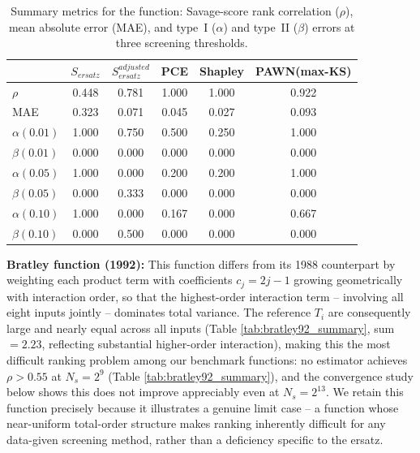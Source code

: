 \documentclass[12pt]{article}
\begin{document}
\begin{table}[H]
\centering
\begin{tabular}{@{}l|ccccc@{}} \toprule
 & $S_{ersatz}$ & $S^{adjusted}_{ersatz}$ & PCE & Shapley & PAWN(max-KS) \\ \midrule
$\rho$           & 0.448 & 0.781 & 1.000 & 1.000 & 0.922 \\
MAE              & 0.323 & 0.071 & 0.045 & 0.027 & 0.093 \\
$\alpha(0.01)$   & 1.000 & 0.750 & 0.500 & 0.250 & 1.000 \\
$\beta(0.01)$    & 0.000 & 0.000 & 0.000 & 0.000 & 0.000 \\
$\alpha(0.05)$   & 1.000 & 0.000 & 0.200 & 0.200 & 1.000 \\
$\beta(0.05)$    & 0.000 & 0.333 & 0.000 & 0.000 & 0.000 \\
$\alpha(0.10)$   & 1.000 & 0.000 & 0.167 & 0.000 & 0.667 \\
$\beta(0.10)$    & 0.000 & 0.500 & 0.000 & 0.000 & 0.000 \\ \bottomrule
\end{tabular}
\caption{Summary metrics for the \cite{bratley1988algorithm} function: Savage-score rank correlation ($\rho$), mean absolute error (MAE), and type~I ($\alpha$) and type~II ($\beta$) errors at three screening thresholds.}
\label{tab:bratley88_summary}
\end{table}

\textbf{Bratley function (1992):} This function differs from its 1988 counterpart by weighting each product term with coefficients $c_j=2j-1$ growing geometrically with interaction order, so that the highest-order interaction term -- involving all eight inputs jointly -- dominates total variance. The reference $T_i$ are consequently large and nearly equal across all inputs (Table \ref{tab:bratley92_summary}, sum $=2.23$, reflecting substantial higher-order interaction), making this the most difficult ranking problem among our benchmark functions: no estimator achieves $\rho>0.55$ at $N_s=2^9$ (Table \ref{tab:bratley92_summary}), and the convergence study below shows this does not improve appreciably even at $N_s=2^{13}$. We retain this function precisely because it illustrates a genuine limit case -- a function whose near-uniform total-order structure makes ranking inherently difficult for any data-given screening method, rather than a deficiency specific to the ersatz.
\end{document}

